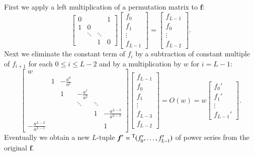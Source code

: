 \documentclass[12pt]{article}
\numberwithin{equation}{section}
\begin{document}
First we apply a left multiplication of a permutation matrix
to ${\boldsymbol f}$:
\[
\begin{bmatrix}
0 &  &&1
\\
1&0&&
\\
 &\ddots& \ddots\\ 
& & 1&0
\end{bmatrix}
\begin{bmatrix}
f_0 \\ f_1 \\
\vdots    \\ 
f_{L-1}
\end{bmatrix}
=\begin{bmatrix}
f_{L-1} \\ f_0 \\
\vdots    \\ 
f_{L-2}
\end{bmatrix}.
\]
Next we eliminate the constant term of $f_i$ by a subtraction of 
constant multiple of $f_{i+1}$ for each $0 \leq i \leq L-2$
and by a multiplication by $w$ for $i=L-1$:
\[
 \begin{bmatrix}
w &  &&&&
\\
&1&-\frac{a^0}{a^1}&&&
\\
&&1&-\frac{a^1}{a^2}&&
\\
&& &\ddots& \ddots
\\ 
&&&&1&-\frac{a^{L-3}}{a^{L-2}}
\\
-\frac{a^{L-2}}{a^{L-1}}& & &&&1
\end{bmatrix}
\begin{bmatrix}
f_{L-1} \\ f_0 \\ f_1 \\
\vdots    \\ f_{L-3} \\
f_{L-2}
\end{bmatrix}
=
O(w)
=
w
\begin{bmatrix}
f_0' \\  f_1' \\
\vdots    \\ 
 f_{L-1}'
\end{bmatrix}.
\] 
Eventually
we obtain a new $L$-tuple
 ${\boldsymbol f'}={}^{\rm T}(f_0',\ldots,f_{L-1}')$ 
of power series from the original ${\boldsymbol f}$.
\end{document}
